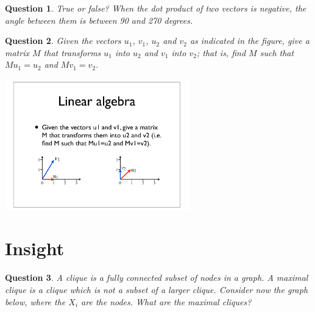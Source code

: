 \documentclass[13pt,a4paper]{article}
\newtheorem{question}{Question}
\begin{document}
\begin{question}
True or false?  When the dot product of two vectors is negative, the angle between them is between 90 and 270 degrees.
\end{question}

\begin{question}
Given the vectors $u_1$, $v_1$, $u_2$ and $v_2$ as indicated in the figure, give a matrix $M$ that transforms $u_1$
into $u_2$ and $v_1$ into $v_2$; that is, find $M$ such that $M u_1=u_2$ and $M v_1=v_2$.

\includegraphics[width=0.6\textwidth]{fig.pdf}
\end{question}

\section{Insight}

\begin{question}
A clique is  a fully connected subset of nodes in a graph. 
A maximal clique is a clique which is not a subset of a larger clique.
Consider now the graph below, where the $X_i$ are the nodes.  What are the maximal cliques? 
\begin{center}
\end{center}
\end{question}
\end{document}
